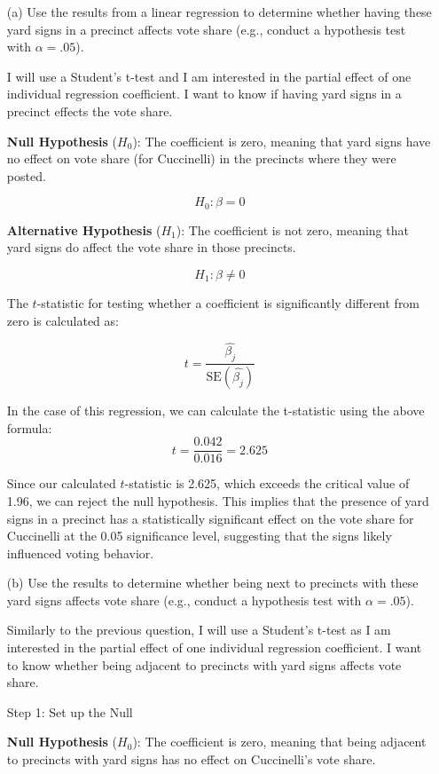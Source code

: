 \documentclass[12pt,letterpaper]{article}
\begin{document}
\vspace{.5cm}
\begin{enumerate}
	\item [(a)] Use the results from a linear regression to determine whether having these yard signs in a precinct affects vote share (e.g., conduct a hypothesis test with $\alpha = .05$).
	
	I will use a Student's t-test and I am interested in the partial effect of one individual regression coefficient. I want to know if having yard signs in a precinct effects the vote share.  
	
	\textbf{Null Hypothesis} (\( H_0 \)): The coefficient is zero, meaning that yard signs have no effect on vote share (for Cuccinelli) in the precincts where they were posted.
	
	\[
	H_0: \beta = 0
	\]
	
	\textbf{Alternative Hypothesis} (\( H_1 \)): The coefficient is not zero, meaning that yard signs do affect the vote share in those precincts.
	
	\[
	H_1: \beta \neq 0
	\]
	
	The \( t \)-statistic for testing whether a coefficient is significantly different from zero is calculated as:
	
\[
t = \frac{\hat{\beta_j}}{\text{SE}(\hat{\beta_j})}
\]

	In the case of this regression, we can calculate the t-statistic using the above formula: 
	\[
	t = \frac{0.042}{0.016} = 2.625
	\]
	
	Since our calculated \( t \)-statistic is 2.625, which exceeds the critical value of 1.96, we can reject the null hypothesis. This implies that the presence of yard signs in a precinct has a statistically significant effect on the vote share for Cuccinelli at the 0.05 significance level, suggesting that the signs likely influenced voting behavior.
	

	\item [(b)]  Use the results to determine whether being
	next to precincts with these yard signs affects vote
	share (e.g., conduct a hypothesis test with $\alpha = .05$).
	
	Similarly to the previous question,	I will use a Student's t-test as I am interested in the partial effect of one individual regression coefficient. I want to know  whether being adjacent to precincts with yard signs affects vote share.  
	
	Step 1: Set up the Null 
	
		\textbf{Null Hypothesis} (\( H_0 \)): The coefficient is zero, meaning that being adjacent to precincts with yard signs has no effect on Cuccinelli’s vote share.
	

\end{enumerate}
\end{document}
